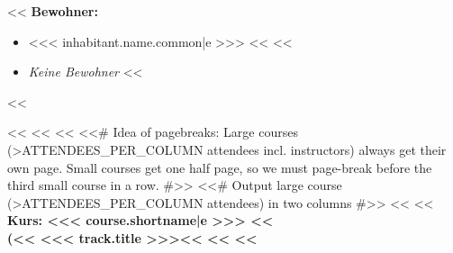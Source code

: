         \setlength{\columnsep}{2cm}
        \begin{minipage}[t]{0.5\textwidth}
            <<%
                {
                    \headingfamily\bfseries Bewohner:
                }
                \begin{itemize}
                    <<%
                            if inhabitant.parts[part].status == ENUMS.RegistrationPartStati.participant -%
                        \item <<< inhabitant.name.common|e >>>
                            <<%
                    <<%
                        \item \textit{Keine Bewohner}
                    <<%
                \end{itemize}
            <<%
        \end{minipage}%
        <<%
        <<%
            <<%
            <<# Idea of pagebreaks: Large courses (>ATTENDEES_PER_COLUMN attendees incl. instructors) always get their
                own page. Small courses get one half page, so we must page-break before the third small course in a row.
                #>>
            <<# Output large course (>ATTENDEES_PER_COLUMN attendees) in two columns #>>
            <<%
                <<%
                {\headingfamily\bfseries
                    Kurs: <<< course.shortname|e >>>
                    <<%
                        \\\mdseries
                        (<<%
                            <<< track.title >>><<%
                         <<%
                    <<%
                    \vspace{0.6\baselineskip}
                }

